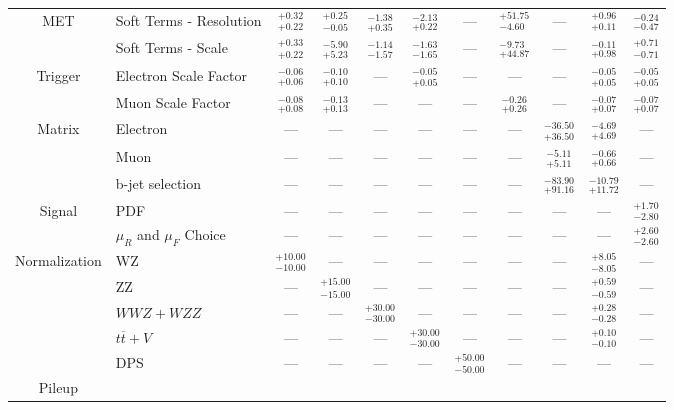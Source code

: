 \begin{tabular}{|cl||ccccccc|c||c|}
\hline
\multirow{2}{*}{MET}
&Soft Terms - Resolution &  $^{+0.32}_{+0.22}$  &  $^{+0.25}_{-0.05}$  &  $^{-1.38}_{+0.35}$  &  $^{-2.13}_{+0.22}$  & --- &  $^{+51.75}_{-4.60}$  & --- &  $^{+0.96}_{+0.11}$  &  $^{-0.24}_{-0.47}$ \\ 
\cline{2-11}
&Soft Terms - Scale &  $^{+0.33}_{+0.22}$  &  $^{-5.90}_{+5.23}$  &  $^{-1.14}_{-1.57}$  &  $^{-1.63}_{-1.65}$  & --- &  $^{-9.73}_{+44.87}$  & --- &  $^{-0.11}_{+0.98}$  &  $^{+0.71}_{-0.71}$ \\ 
\hline
\multirow{2}{*}{Trigger}
&Electron Scale Factor &  $^{-0.06}_{+0.06}$  &  $^{-0.10}_{+0.10}$  & --- &  $^{-0.05}_{+0.05}$  & --- & --- & --- &  $^{-0.05}_{+0.05}$  &  $^{-0.05}_{+0.05}$ \\ 
\cline{2-11}
&Muon Scale Factor &  $^{-0.08}_{+0.08}$  &  $^{-0.13}_{+0.13}$  & --- & --- & --- &  $^{-0.26}_{+0.26}$  & --- &  $^{-0.07}_{+0.07}$  &  $^{-0.07}_{+0.07}$ \\ 
\hline
\multirow{2}{*}{Matrix}
&Electron & --- & --- & --- & --- & --- & --- &  $^{-36.50}_{+36.50}$  &  $^{-4.69}_{+4.69}$  & ---\\ 
\cline{2-11}
\multirow{2}{*}{Method}
&Muon & --- & --- & --- & --- & --- & --- &  $^{-5.11}_{+5.11}$  &  $^{-0.66}_{+0.66}$  & ---\\ 
\cline{2-11}
&b-jet selection & --- & --- & --- & --- & --- & --- &  $^{-83.90}_{+91.16}$  &  $^{-10.79}_{+11.72}$  & ---\\ 
\hline
\multirow{2}{*}{Signal}
&PDF & --- & --- & --- & --- & --- & --- & --- & --- &  $^{+1.70}_{-2.80}$ \\ 
\cline{2-11}
&$\mu_{R}$ and $\mu_{F}$ Choice & --- & --- & --- & --- & --- & --- & --- & --- &  $^{+2.60}_{-2.60}$ \\ 
\hline
\multirow{5}{*}{Normalization}
&WZ &  $^{+10.00}_{-10.00}$  & --- & --- & --- & --- & --- & --- &  $^{+8.05}_{-8.05}$  & ---\\ 
\cline{2-11}
&ZZ & --- &  $^{+15.00}_{-15.00}$  & --- & --- & --- & --- & --- &  $^{+0.59}_{-0.59}$  & ---\\ 
\cline{2-11}
&$WWZ+WZZ$ & --- & --- &  $^{+30.00}_{-30.00}$  & --- & --- & --- & --- &  $^{+0.28}_{-0.28}$  & ---\\ 
\cline{2-11}
&$t\overline{t}+V$ & --- & --- & --- &  $^{+30.00}_{-30.00}$  & --- & --- & --- &  $^{+0.10}_{-0.10}$  & ---\\ 
\cline{2-11}
&DPS & --- & --- & --- & --- &  $^{+50.00}_{-50.00}$  & --- & --- & --- & ---\\ 
\hline
\multirow{1}{*}{Pileup}

\end{tabular}
